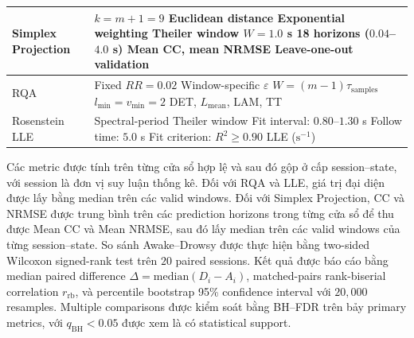\begin{table}[t]
\begin{tabularx}{\columnwidth}{p{} X}
        \midrule

        Simplex Projection
        &
        \makecell[l]{
        $k=m+1=9$ \\
        Euclidean distance \\
        Exponential weighting \\
        Theiler window $W=1.0$ s \\
        18 horizons ($0.04$--$4.0$ s) \\
        Mean CC, mean NRMSE \\
        Leave-one-out validation
        }
        \\

        \midrule

        RQA
        &
        \makecell[l]{
        Fixed $RR=0.02$ \\
        Window-specific $\varepsilon$ \\
        $W=(m-1)\tau_{\mathrm{samples}}$ \\
        $l_{\min}=v_{\min}=2$ \\
        DET, $L_{\mathrm{mean}}$, LAM, TT
        }
        \\

        \midrule

        Rosenstein LLE
        
        &
        \makecell[l]{
        Spectral-period Theiler window \\
        Fit interval: $0.80$--$1.30$ s \\
        Follow time: $5.0$ s \\
        Fit criterion: $R^2\geq0.90$ \\
        LLE ($\mathrm{s}^{-1}$)
        }
        \\  

        \bottomrule
    \end{tabularx}
\end{table}

Các metric được tính trên từng cửa sổ hợp lệ và sau đó gộp ở cấp session--state, với session là đơn vị suy luận thống kê. Đối với RQA và LLE, giá trị đại diện được lấy bằng median trên các valid windows. Đối với Simplex Projection, CC và NRMSE được trung bình trên các prediction horizons trong từng cửa sổ để thu được Mean CC và Mean NRMSE, sau đó lấy median trên các valid windows của từng session--state. So sánh Awake--Drowsy được thực hiện bằng two-sided Wilcoxon signed-rank test trên $20$ paired sessions. Kết quả được báo cáo bằng median paired difference $\Delta=\mathrm{median}(D_i-A_i)$, matched-pairs rank-biserial correlation $r_{\mathrm{rb}}$, và percentile bootstrap 95\% confidence interval với $20{,}000$ resamples. Multiple comparisons được kiểm soát bằng BH--FDR trên bảy primary metrics, với $q_{\mathrm{BH}}<0.05$ được xem là có statistical support.


